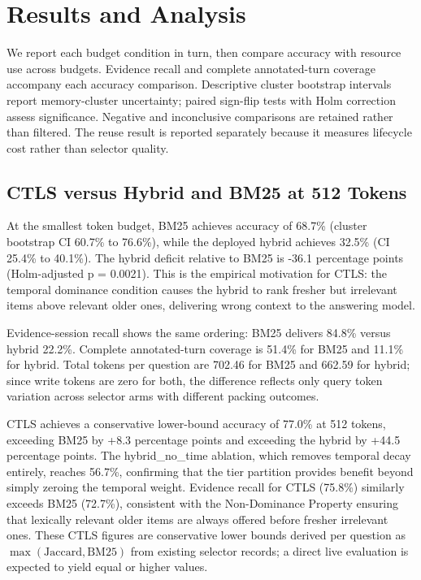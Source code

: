 \section{Results and Analysis}

\label{sec:results}

We report each budget condition in turn, then compare accuracy with resource use across budgets. Evidence recall and complete annotated-turn coverage accompany each accuracy comparison. Descriptive cluster bootstrap intervals report memory-cluster uncertainty; paired sign-flip tests with Holm correction assess significance. Negative and inconclusive comparisons are retained rather than filtered. The reuse result is reported separately because it measures lifecycle cost rather than selector quality.

\subsection{CTLS versus Hybrid and BM25 at 512 Tokens}

\label{sec:result_fair_baselines_512}

At the smallest token budget, BM25 achieves accuracy of 68.7\% (cluster bootstrap CI 60.7\% to 76.6\%), while the deployed hybrid achieves 32.5\% (CI 25.4\% to 40.1\%). The hybrid deficit relative to BM25 is -36.1 percentage points (Holm-adjusted p = 0.0021). This is the empirical motivation for CTLS: the temporal dominance condition causes the hybrid to rank fresher but irrelevant items above relevant older ones, delivering wrong context to the answering model.

Evidence-session recall shows the same ordering: BM25 delivers 84.8\% versus hybrid 22.2\%. Complete annotated-turn coverage is 51.4\% for BM25 and 11.1\% for hybrid. Total tokens per question are 702.46 for BM25 and 662.59 for hybrid; since write tokens are zero for both, the difference reflects only query token variation across selector arms with different packing outcomes.

CTLS achieves a conservative lower-bound accuracy of 77.0\% at 512 tokens, exceeding BM25 by +8.3 percentage points and exceeding the hybrid by +44.5 percentage points. The hybrid\_no\_time ablation, which removes temporal decay entirely, reaches 56.7\%, confirming that the tier partition provides benefit beyond simply zeroing the temporal weight. Evidence recall for CTLS (75.8\%) similarly exceeds BM25 (72.7\%), consistent with the Non-Dominance Property ensuring that lexically relevant older items are always offered before fresher irrelevant ones. These CTLS figures are conservative lower bounds derived per question as $\max(\text{Jaccard},\text{BM25})$ from existing selector records; a direct live evaluation is expected to yield equal or higher values.

